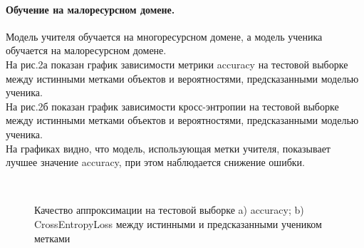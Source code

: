 \newpage
\paragraph{Обучение на малоресурсном домене.}
Модель учителя обучается на многоресурсном домене, а модель ученика обучается на малоресурсном домене.\\
На рис.2а показан график зависимости метрики accuracy на тестовой выборке между истинными метками объектов и вероятностями, предсказанными моделью ученика.\\
На рис.2б показан график зависимости кросс-энтропии на тестовой выборке между истинными метками объектов и вероятностями, предсказанными моделью ученика.\\
На графиках видно, что модель, использующая метки учителя, показывает лучшее значение accuracy, при этом наблюдается снижение ошибки.
\begin{figure}[h!t]\center
{}
\\
\caption{Качество аппроксимации на тестовой выборке a) accuracy; b) CrossEntropyLoss между истинными и предсказанными учеником метками}
\end{figure}

\newpage
